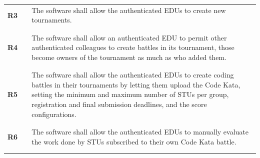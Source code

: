 \begin{longtable}[H]{l l p{12cm}}
    \textbf{R3}  & \vline & The software shall allow the authenticated EDUs to create new tournaments.                                                                                                                                                                                                      \\
                 &        &                                                                                                                                                                                                                                                                                 \\\hline & & \\
    \textbf{R4}  & \vline & The software shall allow an authenticated EDU to permit other authenticated colleagues to create battles in its tournament, those become owners of the tournament as much as who added them.                                                                                    \\
                 &        &                                                                                                                                                                                                                                                                                 \\\hline & & \\
    \textbf{R5}  & \vline & The software shall allow the authenticated EDUs to create coding battles in their tournaments by letting them upload the Code Kata, setting the minimum and maximum number of STUs per group, registration and final submission deadlines, and the score configurations.        \\
                 &        &                                                                                                                                                                                                                                                                                 \\\hline & & \\
    \textbf{R6}  & \vline & The software shall allow the authenticated EDUs to manually evaluate the work done by STUs subscribed to their own Code Kata battle.                                                                                                                                            \\
                 &        &                                                                                                                                                                                                                                                                                 \\\hline & & \\

\end{longtable}
